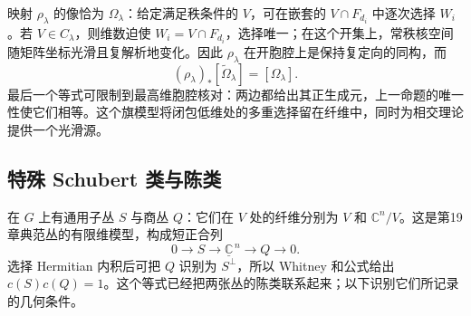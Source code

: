\ProseParagraphBreak

映射 \(\rho_\lambda\) 的像恰为 \(\Omega_\lambda\)：给定满足秩条件的 \(V\)，可在嵌套的 \(V\cap F_{d_i}\) 中逐次选择 \(W_i\)。若 \(V\in C_\lambda\)，则维数迫使 \(W_i=V\cap F_{d_i}\)，选择唯一；在这个开集上，常秩核空间随矩阵坐标光滑且复解析地变化。因此 \(\rho_\lambda\) 在开胞腔上是保持复定向的同构，而
\begin{equation}\label{g2:eq:schubert-resolution-class}
	(\rho_\lambda)_*[\widetilde\Omega_\lambda]=[\Omega_\lambda].
\end{equation}
最后一个等式可限制到最高维胞腔核对：两边都给出其正生成元，上一命题的唯一性使它们相等。这个旗模型将闭包低维处的多重选择留在纤维中，同时为相交理论提供一个光滑源。

\subsection{特殊 Schubert 类与陈类}
\label{g2:subsec:2105:03}
在 \(G\) 上有通用子丛 \(S\) 与商丛 \(Q\)：它们在 \(V\) 处的纤维分别为 \(V\) 和 \(\mathbb C^n/V\)。这是第19章典范丛的有限维模型，构成短正合列
\begin{equation}\label{g2:eq:grassmann-tautological-sequence}
	0\longrightarrow S\longrightarrow\underline{\mathbb C}^{\,n}\longrightarrow Q\longrightarrow0.
\end{equation}
选择 Hermitian 内积后可把 \(Q\) 识别为 \(S^\perp\)，所以 Whitney 和公式给出 \(c(S)c(Q)=1\)。这个等式已经把两张丛的陈类联系起来；以下识别它们所记录的几何条件。

